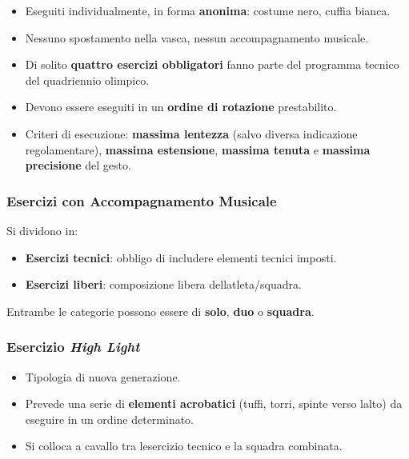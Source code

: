 \documentclass[a4paper,11pt]{article}
\providecommand{\tightlist}{%
  \setlength{\itemsep}{0pt}\setlength{\parskip}{0pt}}
\begin{document}
\begin{itemize}
      \tightlist
      \item
            Eseguiti individualmente, in forma \textbf{anonima}: costume nero,
            cuffia bianca.
      \item
            Nessuno spostamento nella vasca, nessun accompagnamento musicale.
      \item
            Di solito \textbf{quattro esercizi obbligatori} fanno parte del
            programma tecnico del quadriennio olimpico.
      \item
            Devono essere eseguiti in un \textbf{ordine di rotazione}
            prestabilito.
      \item
            Criteri di esecuzione: \textbf{massima lentezza} (salvo diversa
            indicazione regolamentare), \textbf{massima estensione},
            \textbf{massima tenuta} e \textbf{massima precisione} del gesto.
\end{itemize}

\subsubsection{Esercizi con Accompagnamento
      Musicale}\label{esercizi-con-accompagnamento-musicale}

Si dividono in:

\begin{itemize}
      \tightlist
      \item
            \textbf{Esercizi tecnici}: obbligo di includere elementi tecnici
            imposti.
      \item
            \textbf{Esercizi liberi}: composizione libera
            dell\textquotesingle atleta/squadra.
\end{itemize}

Entrambe le categorie possono essere di \textbf{solo}, \textbf{duo} o
\textbf{squadra}.

\subsubsection{\texorpdfstring{Esercizio \emph{High
                  Light}}{Esercizio High Light}}\label{esercizio-high-light}

\begin{itemize}
      \tightlist
      \item
            Tipologia di nuova generazione.
      \item
            Prevede una serie di \textbf{elementi acrobatici} (tuffi, torri,
            spinte verso l\textquotesingle alto) da eseguire in un ordine
            determinato.
      \item
            Si colloca a cavallo tra l\textquotesingle esercizio tecnico e la
            squadra combinata.
\end{itemize}
\end{document}
